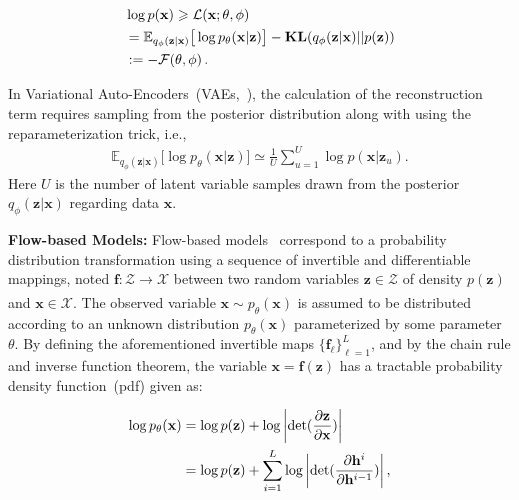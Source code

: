 \documentclass[sigconf, anonymous, review]{acmart}
\theoremstyle{plain}
\theoremstyle{definition}
\theoremstyle{remark}
\begin{document}
\vspace{-0.15in}
\begin{align}\label{eq:vi_elbo}
   & \log p(\mathbf{x})
    \geqslant \mathcal{L}(\mathbf{x}; \theta, \phi) \\ \notag
    &=\mathbb{E}_{q_{\phi}(\mathbf{z}|\mathbf{x})} \big[\log p_{\theta}(\mathbf{x}|\mathbf{z}) \big] - \textbf{\text{KL}}(q_{\phi}(\mathbf{z}|\mathbf{x})||p(\mathbf{z}))\\ \notag
    &:=-\mathcal{F}(\theta, \phi) \, .
\end{align}
\vspace{-0.15in}

\noindent In Variational Auto-Encoders~(VAEs,~\cite{kingma2013auto,rezende2014stochastic}), the calculation of the reconstruction term requires sampling from the posterior distribution along with using the reparameterization trick, i.e.,
\begin{align} \label{eq:vae_recon}
\mathbb{E}_{q_{\phi}(\mathbf{z}|\mathbf{x})} \big[\log p_{\theta}(\mathbf{x}|\mathbf{z}) \big] \simeq \frac{1}{U}\sum_{u=1}^U \log p(\mathbf{x}| \mathbf{z}_{u}). \end{align} 
Here $U$ is the number of latent variable samples drawn from the posterior $q_{\phi}(\mathbf{z}|\mathbf{x})$ regarding data $\mathbf{x}$. 

\textbf{Flow-based Models:}
Flow-based models~\cite{Dinh2016DensityEU, dinh2014nice,rezende2015variational,berg2018sylvester} 
correspond to a probability distribution transformation using  a sequence of invertible and differentiable mappings, noted $\mathbf{f}: \mathcal{Z} \xrightarrow[]{} \mathcal{X}$ between two random variables $\mathbf{z} \in \mathcal{Z}$ of density $p(\mathbf{z})$ and $\mathbf{x} \in \mathcal{X}$. The observed variable $\mathbf{x} \sim p_{\theta}(\mathbf{x})$ is assumed to be distributed according to an unknown distribution $p_{\theta}(\mathbf{x})$ parameterized by some parameter $\theta$. 
By defining the aforementioned invertible maps $\{\mathbf{f}_{\ell} \}_{\ell =1}^L$, and by the chain rule and inverse function theorem, the variable $\mathbf{x}=\mathbf{f}(\mathbf{z})$ has a tractable probability density function~(pdf) given as:

\vspace{-0.15in}
\begin{align}\label{eq:flow}
\log p_{\theta}(\mathbf{x})& = \log p(\mathbf{z})  + \log \bigg| \text{det} ( \frac{\partial \mathbf{z} }{\partial \mathbf{x}} ) \bigg| 
\\\notag
& =  \log p(\mathbf{z}) + \sum_{i=1}^L\log \bigg| \text{det} ( \frac{\partial \mathbf{h}^i } {\partial \mathbf{h}^{i-1}}) \bigg| \, ,
\end{align}
\end{document}
